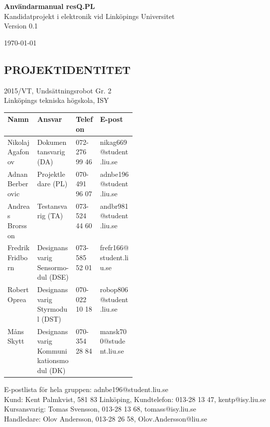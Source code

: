 \documentclass[11pt]{article}
\date{\today} %
\date{\today}
\begin{document}
\begin{titlepage}
\begin{center}
{{\Large\bfseries Användarmanual resQ.PL} \\ Kandidatprojekt i elektronik vid Linköpings Universitet}\\
%
\vspace{1\baselineskip}
%
Version 0.1\\
\vspace{2\baselineskip}

\vspace{2\baselineskip}
\today

\end{center}
\end{titlepage}

\pagebreak
\begin{center}

\section*{PROJEKTIDENTITET}
2015/VT, Undsättningsrobot Gr. 2
\\
Linköpings tekniska högskola, ISY
\\[0.5in]
\begin{table}[h]
\begin{tabular}{|l|p{0.3\linewidth}|l|l|} \hline
Namn & Ansvar & Telefon & E-post \\[0.1in] \hline
Nikolaj Agafonov & Dokumentansvarig (DA) & 072-276 99 46 & nikag669@student.liu.se \\ \hline
Adnan Berberovic & Projektledare (PL) & 070-491 96 07 & adnbe196@student.liu.se \\ \hline
Andreas Brorsson & Testansvarig (TA) & 073-524 44 60 & andbr981@student.liu.se \\ \hline
Fredrik Fridborn & Designansvarig Sensormo-
dul (DSE) & 073-585 52 01 & frefr166@student.liu.se \\ \hline
Robert Oprea & Designansvarig Styrmodul (DST) & 070-022 10 18 & robop806@student.liu.se \\ \hline
Måns Skytt & Designansvarig Kommunikationsmodul (DK) & 070-354 28 84 & mansk700@student.liu.se \\ \hline
\end{tabular}
\end{table}

E-postlista för hela gruppen: adnbe196@student.liu.se
\\[1in]
Kund: Kent Palmkvist, 581 83 Linköping,
Kundtelefon: 013-28 13 47, kentp@isy.liu.se
\\[1in]
Kursansvarig: Tomas Svensson, 013-28 13 68, tomass@isy.liu.se
\\
Handledare: Olov Andersson, 013-28 26 58, Olov.Andersson@liu.se
\end{center}
\pagebreak
\end{document}
